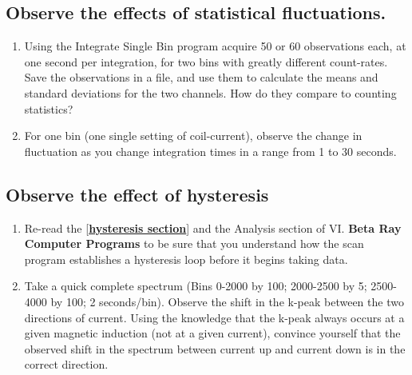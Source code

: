 \documentclass{../lab}
\begin{document}
\subsection{Observe the effects of statistical fluctuations.}

\begin{enumerate}
    \item Using the Integrate Single Bin program acquire 50 or 60 observations each, at one second per integration, for two bins with greatly different count-rates. Save the observations in a file, and use them to calculate the means and standard deviations for the two channels. How do they compare to counting statistics?

    \item For one bin (one single setting of coil-current), observe the change in fluctuation as you change integration times in a range from 1 to 30 seconds.
    
\end{enumerate}

\subsection{Observe the effect of hysteresis}

\begin{enumerate}
    \item Re-read the [\href{http://experimentationlab.berkeley.edu/Hysteresis}{\textbf{hysteresis section}}] and the Analysis section of VI. \textbf{Beta Ray Computer Programs} to be sure that you understand how the scan program establishes a hysteresis loop before it begins taking data.

    \item Take a quick complete spectrum (Bins 0-2000 by 100; 2000-2500 by 5; 2500-4000 by 100; 2 seconds/bin). Observe the shift in the k-peak between the two directions of current. Using the knowledge that the k-peak always occurs at a given magnetic induction (not at a given current), convince yourself that the observed shift in the spectrum between current up and current down is in the correct direction.
    
    

\end{enumerate}
\end{document}
